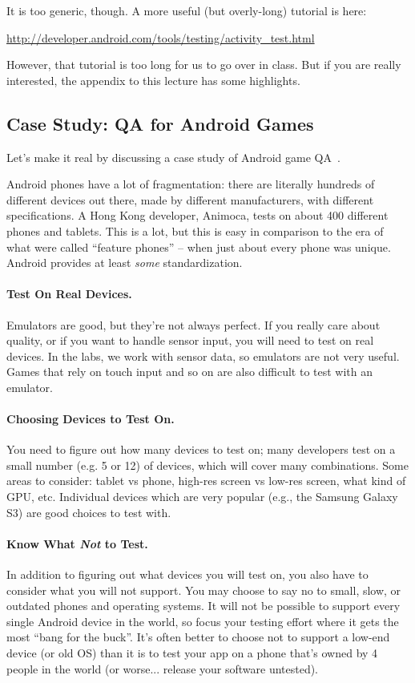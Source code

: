 It is too generic, though. A more useful (but overly-long) tutorial is here:

\begin{center}
{\url{http://developer.android.com/tools/testing/activity_test.html}}
\end{center}

However, that tutorial is too long for us to go over in class. But if you are really interested, the appendix to this lecture has some highlights.


\subsection*{Case Study: QA for Android Games}
Let's make it real by discussing a case study of Android game QA~\cite{techcrunch}.

Android phones have a lot of fragmentation: there are literally hundreds of different devices out there, made by different manufacturers, with different specifications. A Hong Kong developer, Animoca, tests on about 400 different phones and tablets. This is a lot, but this is easy in comparison to the era of what were called ``feature phones'' -- when just about every phone was unique. Android provides at least \emph{some} standardization.

\paragraph{Test On Real Devices.} Emulators are good, but they're not always perfect. 
If you really care about quality, or if you want to handle sensor input, you will need
to test on real devices. In the labs, we work with sensor data, so emulators are not very useful. Games that rely on touch input and so on are also difficult to test with an emulator. 

\paragraph{Choosing Devices to Test On.} You need to figure out how many devices to test on; many developers test on a small number (e.g. 5 or 12) of devices, which will cover many combinations. Some areas to consider: tablet vs phone, high-res screen vs low-res screen, what kind of GPU, etc. Individual devices which are very popular (e.g., the Samsung Galaxy S3) are good choices to test with.


\paragraph{Know What \emph{Not} to Test.} In addition to figuring out what devices you will test on, you also have to consider what you will not support. You may choose to say no to small, slow, or outdated phones and operating systems. It will not be possible to support every single Android device in the world, so focus your testing effort where it gets the most ``bang for the buck''. It's often better to choose not to support a low-end device (or old OS) than it is to test your app on a phone that's owned by 4 people in the world (or worse... release your software untested).

